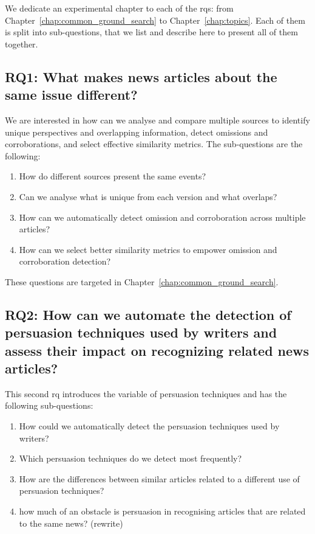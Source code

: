 We dedicate an experimental chapter to each of the \acrlong{rq}s: from Chapter~\ref{chap:common_ground_search} to Chapter~\ref{chap:topics}.
Each of them is split into sub-questions, that we list and describe here to present all of them together.


\subsection*{RQ1: What makes news articles about the same issue different?}

We are interested in how can we analyse and compare multiple sources to identify unique perspectives and overlapping information, detect omissions and corroborations, and select effective similarity metrics.
The sub-questions are the following:
\begin{enumerate}[label={\textbf{RQ1.\arabic*:}},leftmargin=2cm]
    \item How do different sources present the same events?
    \item Can we analyse what is unique from each version and what overlaps? 
    \item How can we automatically detect omission and corroboration across multiple articles?
    \item How can we select better similarity metrics to empower omission and corroboration detection?
\end{enumerate}

These questions are targeted in Chapter~\ref{chap:common_ground_search}.

\subsection*{RQ2: How can we automate the detection of persuasion techniques used by writers and assess their impact on recognizing related news articles?}

This second \acrlong{rq} introduces the variable of persuasion techniques and has the following sub-questions:

\begin{enumerate}[label={\textbf{RQ2.\arabic*:}},leftmargin=2cm]
    \item How could we automatically detect the persuasion techniques used by writers?
    \item Which persuasion techniques do we detect most frequently?
    \item How are the differences between similar articles related to a different use of persuasion techniques?
    \item how much of an obstacle is persuasion in recognising articles that are related to the same news? (rewrite)
\end{enumerate}

